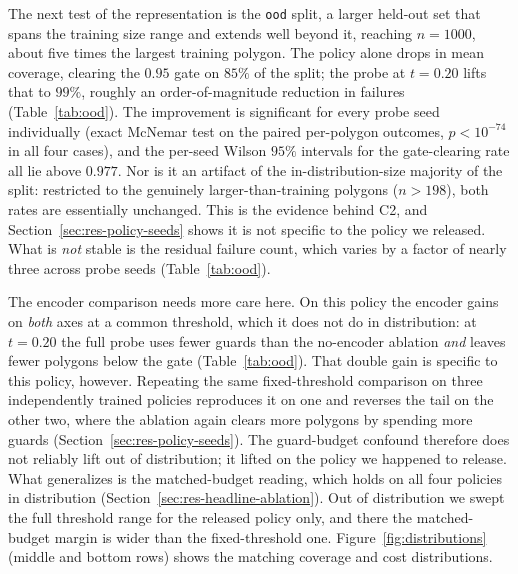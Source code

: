 \documentclass[11pt]{article}
\newcommand{\OPT}{\mathrm{OPT}}
\begin{document}
The next test of the representation is the \texttt{ood} split, a larger held-out set that spans the training size range and extends well beyond it, reaching $n = 1000$, about five times the largest training polygon. The policy alone drops in mean coverage, clearing the $0.95$ gate on $85\%$ of the split; the probe at $t = 0.20$ lifts that to $99\%$, roughly an order-of-magnitude reduction in failures (Table~\ref{tab:ood}). The improvement is significant for every probe seed individually (exact McNemar test on the paired per-polygon outcomes, $p < 10^{-74}$ in all four cases), and the per-seed Wilson $95\%$ intervals for the gate-clearing rate all lie above $0.977$. Nor is it an artifact of the in-distribution-size majority of the split: restricted to the genuinely larger-than-training polygons ($n > 198$), both rates are essentially unchanged. This is the evidence behind C2, and Section~\ref{sec:res-policy-seeds} shows it is not specific to the policy we released. What is \emph{not} stable is the residual failure count, which varies by a factor of nearly three across probe seeds (Table~\ref{tab:ood}).

The encoder comparison needs more care here. On this policy the encoder gains on \emph{both} axes at a common threshold, which it does not do in distribution: at $t = 0.20$ the full probe uses fewer guards than the no-encoder ablation \emph{and} leaves fewer polygons below the gate (Table~\ref{tab:ood}). That double gain is specific to this policy, however. Repeating the same fixed-threshold comparison on three independently trained policies reproduces it on one and reverses the tail on the other two, where the ablation again clears more polygons by spending more guards (Section~\ref{sec:res-policy-seeds}). The guard-budget confound therefore does not reliably lift out of distribution; it lifted on the policy we happened to release. What generalizes is the matched-budget reading, which holds on all four policies in distribution (Section~\ref{sec:res-headline-ablation}). Out of distribution we swept the full threshold range for the released policy only, and there the matched-budget margin is wider than the fixed-threshold one. Figure~\ref{fig:distributions} (middle and bottom rows) shows the matching coverage and cost distributions.

\begin{table}[!ht]
  \centering
  \footnotesize
  \caption{Extreme out-of-distribution evaluation on \texttt{ood-large} ($285$ polygons, $n$ from $600$ to $2250$), coverage scored by exact CGAL at $t = 0.20$ over all $285$. The approximation ratio is omitted because $\OPT$ is unavailable for $79$ polygons ($n \geq 800$; Section~\ref{sec:exp-eval}). The full-probe and no-encoder rows are four-seed mean $\pm$ std; their $\min \mathrm{Cov}$ is the mean $\pm$ std of the four per-seed worst-polygon coverages.}
  \label{tab:large}
\end{table}
\end{document}
